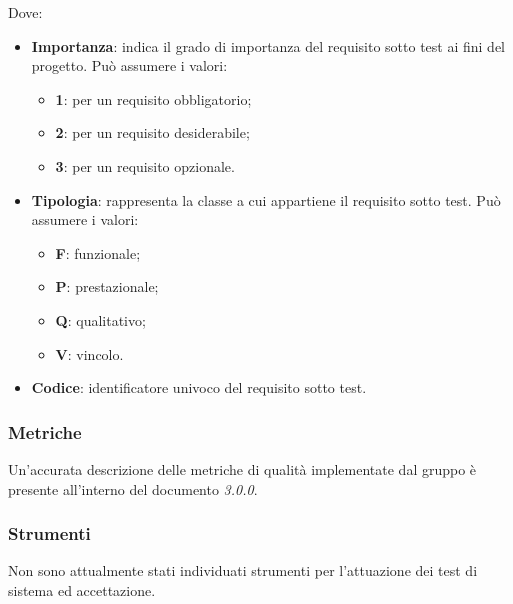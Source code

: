       Dove:
      \begin{itemize}
      	\item{\textbf{Importanza}: indica il grado di importanza del requisito sotto test ai fini del progetto. Può assumere i valori:}
      	\begin{itemize}
      		\item{\textbf{1}: per un requisito obbligatorio;}
      		\item{\textbf{2}: per un requisito desiderabile;}
      		\item{\textbf{3}: per un requisito opzionale.}
      	\end{itemize}
      	
      	\item{\textbf{Tipologia}: rappresenta la classe a cui appartiene il requisito sotto test. Può assumere i valori:}
      	\begin{itemize}
      		\item{\textbf{F}: funzionale;}
      		\item{\textbf{P}: prestazionale;}
      		\item{\textbf{Q}: qualitativo;}
      		\item{\textbf{V}: vincolo.}
      	\end{itemize}
      	
      	\item{\textbf{Codice}: identificatore univoco del requisito sotto test}.
      \end{itemize}
    \subsubsection{Metriche}
    Un'accurata descrizione delle metriche di qualità implementate dal gruppo è presente all'interno del documento \PdQ{} \textit{3.0.0}.
    \subsubsection{Strumenti}
    Non sono attualmente stati individuati strumenti per l'attuazione dei test di sistema ed accettazione.
